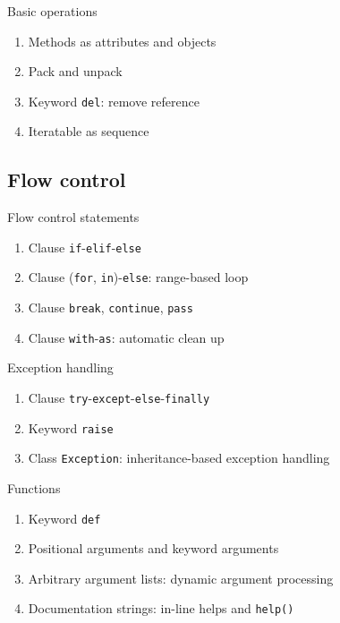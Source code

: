 \documentclass[english, nochinese]{pkuslide}
\begin{document}
\begin{frame}[fragile]{Basic operations}
\begin{enumerate}
\item Methods as attributes and objects
\item Pack and unpack
\item Keyword \verb"del": remove reference
\item Iteratable as sequence
\end{enumerate}
\end{frame}

\subsection{Flow control}

\begin{frame}[fragile]{Flow control statements}
\begin{enumerate}
\item Clause \verb"if"-\verb"elif"-\verb"else"
\item Clause (\verb"for", \verb"in")-\verb"else": range-based loop
\item Clause \verb"break", \verb"continue", \verb"pass"
\item Clause \verb"with"-\verb"as": automatic clean up
\end{enumerate}
\end{frame}

\begin{frame}[fragile]{Exception handling}
\begin{enumerate}
\item Clause \verb"try"-\verb"except"-\verb"else"-\verb"finally"
\item Keyword \verb"raise"
\item Class \verb"Exception": inheritance-based exception handling
\end{enumerate}
\end{frame}

\begin{frame}[fragile]{Functions}
\begin{enumerate}
\item Keyword \verb"def"
\item Positional arguments and keyword arguments
\item Arbitrary argument lists: dynamic argument processing
\item Documentation strings: in-line helps and \verb"help()"
\end{enumerate}
\end{frame}
\end{document}

